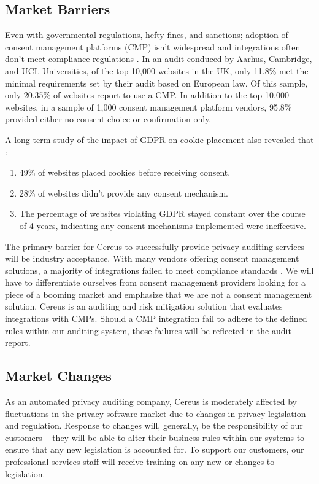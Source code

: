 \subsection{Market Barriers}

Even with governmental regulations, hefty fines, and sanctions; adoption of consent management platforms (CMP) isn't widespread and integrations often don't meet compliance regulations \cite{nouwens.2020}. In an audit conduced by Aarhus, Cambridge, and UCL Universities, of the top 10,000 websites in the UK, only 11.8\% met the minimal requirements set by their audit based on European law. Of this sample, only 20.35\% of websites report to use a CMP. In addition to the top 10,000 websites, in a sample of 1,000 consent management platform vendors, 95.8\% provided either no consent choice or confirmation only.

A long-term study of the impact of GDPR on cookie placement also revealed that \cite{trevisan.2019}:

\begin{enumerate}
  \item 49\% of websites placed cookies before receiving consent.
  \item 28\% of websites didn't provide any consent mechanism.
  \item The percentage of websites violating GDPR stayed constant over the course of 4 years, indicating any consent mechanisms implemented were ineffective.
\end{enumerate}


\noindent
The primary barrier for Cereus to successfully provide privacy auditing services will be industry acceptance. With many vendors offering consent management solutions, a majority of integrations failed to meet compliance standards \cite{nouwens.2020}. We will have to differentiate ourselves from consent management providers looking for a piece of a booming market and emphasize that we are not a consent management solution. Cereus is an auditing and risk mitigation solution that evaluates integrations with CMPs. Should a CMP integration fail to adhere to the defined rules within our auditing system, those failures will be reflected in the audit report.

\subsection{Market Changes}

As an automated privacy auditing company, Cereus is moderately affected by fluctuations in the privacy software market due to changes in privacy legislation and regulation. Response to changes will, generally, be the responsibility of our customers -- they will be able to alter their business rules within our systems to ensure that any new legislation is accounted for. To support our customers, our professional services staff will receive training on any new or changes to legislation.

